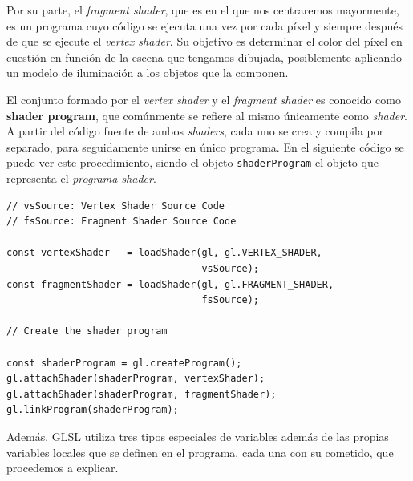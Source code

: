 Por su parte, el \textit{fragment shader}, que es en el que nos centraremos mayormente, es un programa cuyo código se ejecuta una vez por cada píxel y siempre después de que se ejecute el \textit{vertex shader}. Su objetivo es determinar el color del píxel en cuestión en función de la escena que tengamos dibujada, posiblemente aplicando un modelo de iluminación a los objetos que la componen.

El conjunto formado por el \textit{vertex shader} y el \textit{fragment shader} es conocido como \textbf{shader program}, que comúnmente se refiere al mismo únicamente como \textit{shader}. A partir del código fuente de ambos \textit{shaders}, cada uno se crea y compila por separado, para seguidamente unirse en único programa. En el siguiente código se puede ver este procedimiento, siendo el objeto \verb|shaderProgram| el objeto que representa el \textit{programa shader}.

\begin{lstlisting}
// vsSource: Vertex Shader Source Code
// fsSource: Fragment Shader Source Code

const vertexShader   = loadShader(gl, gl.VERTEX_SHADER, 
                                  vsSource);
const fragmentShader = loadShader(gl, gl.FRAGMENT_SHADER, 
                                  fsSource);
  
// Create the shader program

const shaderProgram = gl.createProgram();
gl.attachShader(shaderProgram, vertexShader);
gl.attachShader(shaderProgram, fragmentShader);
gl.linkProgram(shaderProgram);
\end{lstlisting}

Además, GLSL utiliza tres tipos especiales de variables además de las propias variables locales que se definen en el programa, cada una con su cometido, que procedemos a explicar.

